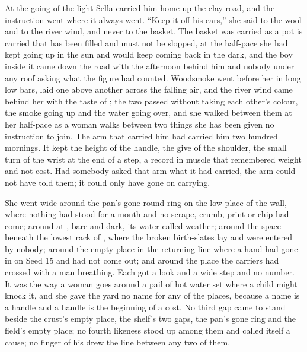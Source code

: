 At the going of the light Sella carried him home up the clay road, and the instruction went where it always went. “Keep it off his ears,” she said to the wool and to the river wind, and never to the basket. The basket was carried as a pot is carried that has been filled and must not be slopped, at the half-pace she had kept going up in the sun and would keep coming back in the dark, and the boy inside it came down the road with the afternoon behind him and nobody under any roof asking what the figure had counted. Woodsmoke went before her in long low bars, laid one above another across the falling air, and the river wind came behind her with the taste of ; the two passed without taking each other's colour, the smoke going up and the water going over, and she walked between them at her half-pace as a woman walks between two things she has been given no instruction to join. The arm that carried him had carried him two hundred mornings. It kept the height of the handle, the give of the shoulder, the small turn of the wrist at the end of a step, a record in muscle that remembered weight and not cost. Had somebody asked that arm what it had carried, the arm could not have told them; it could only have gone on carrying.

She went wide around the pan's gone round ring on the low place of the wall, where nothing had stood for a month and no scrape, crumb, print or chip had come; around  at , bare and dark, its water called weather; around the space beneath the lowest rack of , where the broken birth-slates lay and were entered by nobody; around the empty place in the returning line where a hand had gone in on Seed 15 and had not come out; and around the place the carriers had crossed with a man breathing. Each got a look and a wide step and no number. It was the way a woman goes around a pail of hot water set where a child might knock it, and she gave the yard no name for any of the places, because a name is a handle and a handle is the beginning of a cost. No third gap came to stand beside the crust's empty place, the shelf's two gaps, the pan's gone ring and the field's empty place; no fourth likeness stood up among them and called itself a cause; no finger of his drew the line between any two of them.

